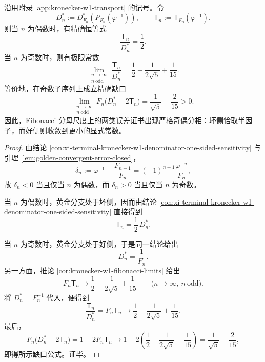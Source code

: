 \begin{theorem}\label{thm:xi-golden-w1-star-certificate-parity-splitting}
沿用附录 \ref{app:kronecker-w1-transport} 的记号。令
\[
D_n^\ast:=D_{F_n}^\ast(P_{F_n}(\varphi^{-1})),
\qquad
\mathsf{T}_n:=\mathsf{T}_{F_n}(\varphi^{-1}).
\]
则当 \(n\) 为偶数时，有精确恒等式
\[
\boxed{\;
\frac{\mathsf{T}_n}{D_n^\ast}=\frac12.\;}
\]
当 \(n\) 为奇数时，则有极限常数
\[
\boxed{\;
\lim_{\substack{n\to\infty\\ n\ \mathrm{odd}}}
\frac{\mathsf{T}_n}{D_n^\ast}
=
\frac12-\frac{1}{2\sqrt5}+\frac1{15}.\;}
\]
等价地，在奇数子序列上成立精确缺口
\[
\boxed{\;
\lim_{\substack{n\to\infty\\ n\ \mathrm{odd}}}
F_n\bigl(D_n^\ast-2\mathsf{T}_n\bigr)
=
\frac1{\sqrt5}-\frac2{15}>0.\;}
\]
因此，Fibonacci 分母尺度上的两类误差证书出现严格奇偶分相：坏侧恰取半因子，而好侧则收敛到更小的显式常数。
\end{theorem}
\begin{proof}
由结论 \ref{con:xi-terminal-kronecker-w1-denominator-one-sided-sensitivity} 与引理 \ref{lem:golden-convergent-error-closed}，
\[
\delta_n:=\varphi^{-1}-\frac{F_{n-1}}{F_n}
=(-1)^{n-1}\frac{\varphi^{-n}}{F_n},
\]
故 \(\delta_n<0\) 当且仅当 \(n\) 为偶数，而 \(\delta_n>0\) 当且仅当 \(n\) 为奇数。

当 \(n\) 为偶数时，黄金分支处于坏侧，因而由结论 \ref{con:xi-terminal-kronecker-w1-denominator-one-sided-sensitivity} 直接得到
\[
\mathsf{T}_n=\frac12\,D_n^\ast.
\]

当 \(n\) 为奇数时，黄金分支处于好侧，于是同一结论给出
\[
D_n^\ast=\frac1{F_n}.
\]
另一方面，推论 \ref{cor:kronecker-w1-fibonacci-limits} 给出
\[
F_n\mathsf{T}_n
\longrightarrow
\frac12-\frac{1}{2\sqrt5}+\frac1{15}
\qquad
\bigl(n\to\infty,\ n\ \mathrm{odd}\bigr).
\]
将 \(D_n^\ast=F_n^{-1}\) 代入，便得到
\[
\frac{\mathsf{T}_n}{D_n^\ast}
=
F_n\mathsf{T}_n
\longrightarrow
\frac12-\frac{1}{2\sqrt5}+\frac1{15}.
\]
最后，
\[
F_n\bigl(D_n^\ast-2\mathsf{T}_n\bigr)
=
1-2F_n\mathsf{T}_n
\longrightarrow
1-2\left(\frac12-\frac{1}{2\sqrt5}+\frac1{15}\right)
=
\frac1{\sqrt5}-\frac2{15},
\]
即得所示缺口公式。证毕。
\end{proof}





